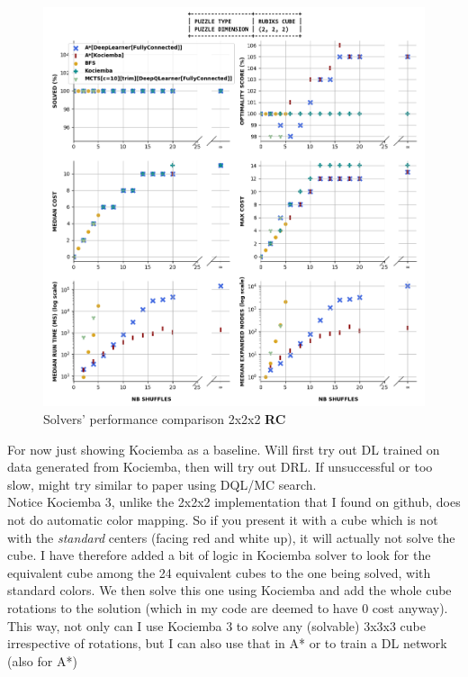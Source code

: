 \begin{figure}[H]
\centering
\includegraphics[scale=0.60]{./Figures/222RCPerformance}
\caption[222RCPerformance]{Solvers' performance comparison 2x2x2 \textbf{RC}}
\label{fig:222RCPerformance}
\end{figure}



\label{sec:ResRubiks333}

For now just showing Kociemba as a baseline. Will first try out DL trained on data generated from Kociemba, then will try out DRL. If unsuccessful or too slow, might try similar to paper using DQL/MC search.
\\
Notice Kociemba 3, unlike the 2x2x2 implementation that I found on github, does not do automatic color mapping. So if you present it with a cube which is not with the \textit{standard} centers (facing red and white up), it will actually not solve the cube. I have therefore added a bit of logic in Kociemba solver to look for the equivalent cube among the 24 equivalent cubes to the one being solved, with standard colors. We then solve this one using Kociemba and add the whole cube rotations to the solution (which in my code are deemed to have 0 cost anyway). This way, not only can I use Kociemba 3 to solve any (solvable) 3x3x3 cube irrespective of rotations, but I can also use that in A* or to train a DL network (also for A*)




